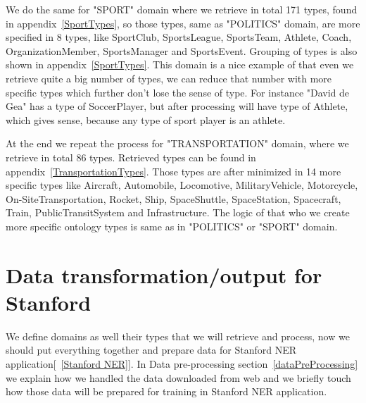 \documentclass[thesis=M,english]{FITthesis}[2018/05/30]
\begin{document}
We do the same for "SPORT" domain where we retrieve in total 171 types, found in appendix~\ref{SportTypes}, so those types, same as "POLITICS" domain, are more specified in 8 types, like SportClub, SportsLeague, SportsTeam, Athlete, Coach, OrganizationMember, SportsManager and SportsEvent. Grouping of types is also shown in appendix~\ref{SportTypes}. This domain is a nice example of that even we retrieve quite a big number of types, we can reduce that number with more specific types which further don't lose the sense of type. For instance "David de Gea" has a type of SoccerPlayer, but after processing will have type of Athlete, which gives sense, because any type of sport player is an athlete.

At the end we repeat the process for "TRANSPORTATION" domain, where we retrieve in total 86 types. Retrieved types can be found in appendix~\ref{TransportationTypes}. Those types are after minimized in 14 more specific types like Aircraft, Automobile, Locomotive, MilitaryVehicle, Motorcycle, On-SiteTransportation, Rocket, Ship, SpaceShuttle, SpaceStation, Spacecraft, Train, PublicTransitSystem and Infrastructure. The logic of that who we create more specific ontology types is same as in "POLITICS" or "SPORT" domain.   



\section{Data transformation/output for Stanford}\label{StanfordNERoutput}
	We define domains as well their types that we will retrieve and process, now we should put everything together and prepare data for Stanford NER application[~\ref{Stanford NER}]. In Data pre-processing section~\ref{dataPreProcessing} we explain how we handled the data downloaded from web and we briefly touch how those data will be prepared for training in Stanford NER application. 
\end{document}
